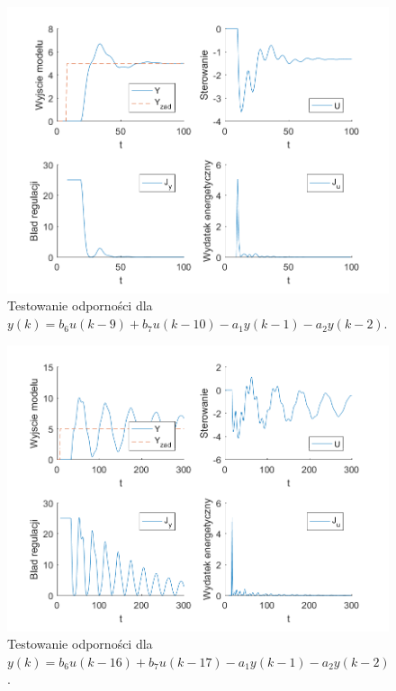 \documentclass[a4paper, 10pt]{article}
\begin{document}
	\begin{figure}[H]
		\centering
		\includegraphics[width=0.9\linewidth]{z6_-3}
		\caption{Testowanie odporności dla  $y(k) = b_6u(k-9)+b_7u(k-10)-a_1y(k-1)-a_2y(k-2)$.}
		\label{fig:z6_-3}
		\end{figure}
		
	\begin{figure}[H]
			\centering
			\includegraphics[width=0.9\linewidth]{z6_-10}
			\caption{Testowanie odporności dla  $y(k) = b_6u(k-16)+b_7u(k-17)-a_1y(k-1)-a_2y(k-2)$.}
			\label{fig:z6_-10}
			\end{figure}
			
\end{document}

